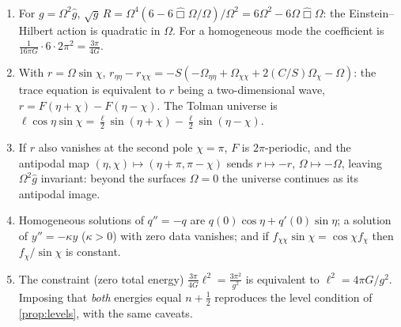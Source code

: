 \begin{proposition}\label{prop:confframe}\ver\
\begin{enumerate}[label=(\roman*)]
\item For $g=\Omega^2\hat g$, $\sqrt g\,R=\Omega^4(6-6\hat\Box\Omega/\Omega)/\Omega^2=6\Omega^2-6\Omega\hat\Box\Omega$: the Einstein--Hilbert action is quadratic in $\Omega$. For a homogeneous mode the coefficient is $\frac1{16\pi G}\cdot6\cdot2\pi^2=\frac{3\pi}{4G}$.
\item With $r=\Omega\sin\chi$, $r_{\eta\eta}-r_{\chi\chi}=-S(-\Omega_{\eta\eta}+\Omega_{\chi\chi}+2(C/S)\Omega_\chi-\Omega)$: the trace equation is equivalent to $r$ being a two-dimensional wave, $r=F(\eta+\chi)-F(\eta-\chi)$. The Tolman universe is $\ell\cos\eta\sin\chi=\frac\ell2\sin(\eta+\chi)-\frac\ell2\sin(\eta-\chi)$.
\item If $r$ also vanishes at the second pole $\chi=\pi$, $F$ is $2\pi$-periodic, and the antipodal map $(\eta,\chi)\mapsto(\eta+\pi,\pi-\chi)$ sends $r\mapsto-r$, $\Omega\mapsto-\Omega$, leaving $\Omega^2\hat g$ invariant: beyond the surfaces $\Omega=0$ the universe continues as its antipodal image.
\item Homogeneous solutions of $q''=-q$ are $q(0)\cos\eta+q'(0)\sin\eta$; a solution of $y''=-\kappa y$ ($\kappa>0$) with zero data vanishes; and if $f_{\chi\chi}\sin\chi=\cos\chi f_\chi$ then $f_\chi/\sin\chi$ is constant.
\item The constraint (zero total energy) $\frac{3\pi}{4G}\ell^2=\frac{3\pi^2}{g^2}$ is equivalent to $\ell^2=4\pi G/g^2$. Imposing that \emph{both} energies equal $n+\frac12$ reproduces the level condition of \cref{prop:levels}, with the same caveats.
\end{enumerate}
\end{proposition}
